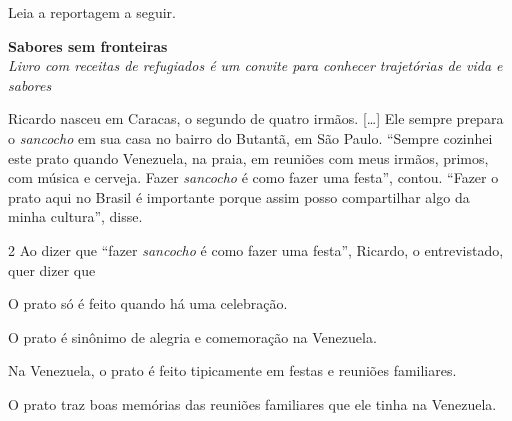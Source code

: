 

Leia a reportagem a seguir.

\begin{myquote}
\begin{center}
\textbf{Sabores sem fronteiras}\\

\emph{Livro com receitas de refugiados é um convite para conhecer
trajetórias de vida e sabores}\\
\end{center}

\medskip

\noindent Ricardo nasceu em Caracas, o segundo de quatro irmãos. {[}\ldots{]} Ele
sempre prepara o \emph{sancocho} em sua casa no bairro do Butantã, em
São Paulo. ``Sempre cozinhei este prato quando Venezuela, na praia, em
reuniões com meus irmãos, primos, com música e cerveja. Fazer
\emph{sancocho} é como fazer uma festa'', contou. ``Fazer o prato aqui
no Brasil é importante porque assim posso compartilhar algo da minha
cultura'', disse.

\end{myquote}

\num{2} Ao dizer que ``fazer \emph{sancocho} é como fazer uma festa'', Ricardo,
o entrevistado, quer dizer que

\begin{escolha}
\item O prato só é feito quando há uma celebração.
\item O prato é sinônimo de alegria e comemoração na Venezuela.
\item Na Venezuela, o prato é feito tipicamente em festas e reuniões
familiares.
\item O prato traz boas memórias das reuniões familiares que ele tinha na
Venezuela.
\end{escolha}

